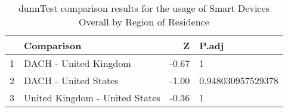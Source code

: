 \begin{table}[ht]
\centering
\begin{tabular}{rlrl}
  \hline
 & Comparison & Z & P.adj \\ 
  \hline
1 & DACH - United Kingdom & -0.67 & 1   \\ 
  2 & DACH - United States & -1.00 & 0.948030957529378   \\ 
  3 & United Kingdom - United States & -0.36 & 1   \\ 
   \hline
\end{tabular}
\caption{dunnTest comparison results for the usage of Smart Devices Overall by Region of Residence} 
\label{RQ2_H2_UsageRegionOtherDevices}
\end{table}
